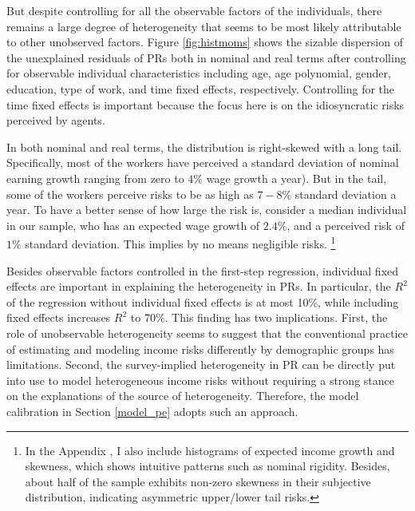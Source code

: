  
But despite controlling for all the observable factors of the individuals, there remains a large degree of heterogeneity that seems to be most likely attributable to other unobserved factors. Figure \ref{fig:histmoms} shows the sizable dispersion of the unexplained residuals of PRs both in nominal and real terms after controlling for observable individual characteristics including age, age polynomial, gender, education, type of work, and time fixed effects, respectively. Controlling for the time fixed effects is important because the focus here is on the idiosyncratic risks perceived by agents. 

In both nominal and real terms, the distribution is right-skewed with a long tail. Specifically, most of the workers have perceived a standard deviation of nominal earning growth ranging from zero to \(4\%\) wage growth a year). But in the tail, some
of the workers perceive risks to be as high as \(7-8\%\) standard
deviation a year. To have a better sense of how large the risk is,
consider a median individual in our sample, who has an expected wage 
growth of \(2.4\%\), and a perceived risk of \(1\%\) standard deviation.
This implies by no means negligible risks.
\footnote{In the Appendix \cite{appendix:other_hist}, I also include histograms of expected income growth and skewness, which shows intuitive patterns such as nominal rigidity. Besides, about half of the sample exhibits non-zero skewness in their subjective distribution, indicating asymmetric upper/lower tail risks.}

Besides observable factors controlled in the first-step regression, individual fixed effects are important in explaining the heterogeneity in PRs. In particular, the $R^2$ of the regression without individual fixed effects is at most 10\%, while including fixed effects increases $R^2$ to $70\%$. This finding has two implications. First, the role of unobservable heterogeneity seems to suggest that the conventional practice of estimating and modeling income risks differently by demographic groups has limitations. Second, the survey-implied heterogeneity in PR can be directly put into use to model heterogeneous income risks without requiring a strong stance on the explanations of the source of heterogeneity. Therefore, the model calibration in Section \ref{model_pe} adopts such an approach.

